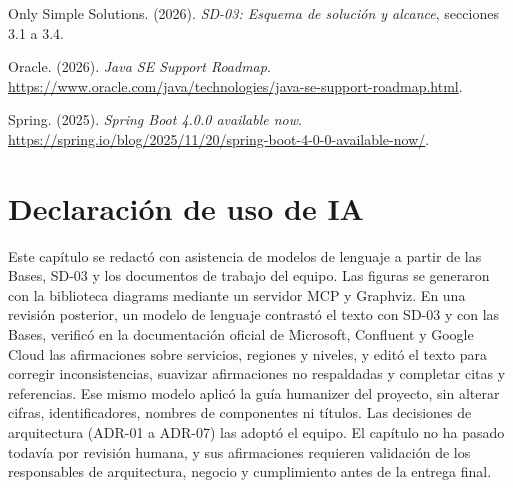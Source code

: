 \documentclass[11pt]{article}
\begin{document}
Only Simple Solutions. (2026). \textit{SD-03: Esquema de solución y alcance}, secciones 3.1 a 3.4.

Oracle. (2026). \textit{Java SE Support Roadmap}. \url{https://www.oracle.com/java/technologies/java-se-support-roadmap.html}.

Spring. (2025). \textit{Spring Boot 4.0.0 available now}. \url{https://spring.io/blog/2025/11/20/spring-boot-4-0-0-available-now/}.

\section*{Declaración de uso de IA}

Este capítulo se redactó con asistencia de modelos de lenguaje a partir de las Bases, SD-03 y los documentos de trabajo del equipo. Las figuras se generaron con la biblioteca diagrams mediante un servidor MCP y Graphviz. En una revisión posterior, un modelo de lenguaje contrastó el texto con SD-03 y con las Bases, verificó en la documentación oficial de Microsoft, Confluent y Google Cloud las afirmaciones sobre servicios, regiones y niveles, y editó el texto para corregir inconsistencias, suavizar afirmaciones no respaldadas y completar citas y referencias. Ese mismo modelo aplicó la guía humanizer del proyecto, sin alterar cifras, identificadores, nombres de componentes ni títulos. Las decisiones de arquitectura (ADR-01 a ADR-07) las adoptó el equipo. El capítulo no ha pasado todavía por revisión humana, y sus afirmaciones requieren validación de los responsables de arquitectura, negocio y cumplimiento antes de la entrega final.

\ossFinalPage
\end{document}
